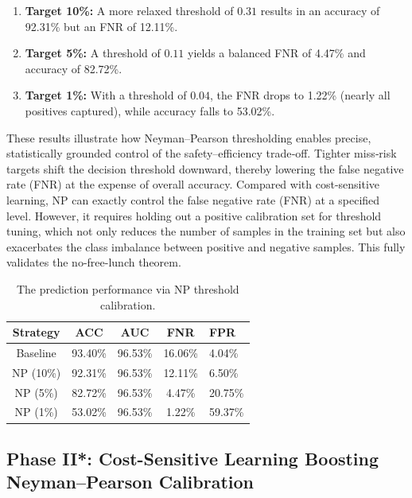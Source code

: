 \documentclass[journal]{IEEEtran}
\theoremstyle{remark}
\begin{document}
\begin{enumerate}
    \item \textbf{Target 10\%:} A more relaxed threshold of $0.31$ results in an accuracy of 92.31\% but an FNR of 12.11\%.
    \item \textbf{Target 5\%:} A threshold of $0.11$ yields a balanced FNR of 4.47\% and accuracy of 82.72\%.
    \item \textbf{Target 1\%:} With a threshold of $0.04$, the FNR drops to 1.22\% (nearly all positives captured), while accuracy falls to 53.02\%.
\end{enumerate}


These results illustrate how Neyman–Pearson thresholding enables precise, statistically grounded control of the safety–efficiency trade‑off. Tighter miss‑risk targets shift the decision threshold downward, thereby lowering the false negative rate (FNR) at the expense of overall accuracy. Compared with cost-sensitive learning, NP can exactly control the false negative rate (FNR) at a specified level. However, it requires holding out a positive calibration set for threshold tuning, which not only reduces the number of samples in the training set but also exacerbates the class imbalance between positive and negative samples. This fully validates the no-free-lunch theorem.

\begin{table}[htbp]
    \centering
    \caption{The prediction performance via NP threshold calibration.}
    \label{tab:table3}     
    \begin{tabular}{ccccl}            
        \toprule
        Strategy & ACC & AUC & FNR & FPR \\
        \midrule
        Baseline & 93.40\% & 96.53\% & 16.06\% & 4.04\% \\
        \midrule
        NP (10\%) & 92.31\% & 96.53\% & 12.11\% & 6.50\% \\
        NP (5\%)  & 82.72\% & 96.53\% & 4.47\% & 20.75\% \\
        NP (1\%)  & 53.02\% & 96.53\% & 1.22\% & 59.37\% \\
        \bottomrule
    \end{tabular}
    \vskip -0.2in
\end{table}


\subsection{Phase II*: Cost-Sensitive Learning Boosting Neyman–Pearson Calibration}\label{S3-4}
\end{document}
